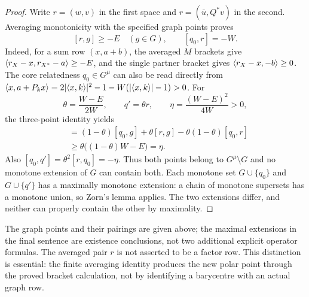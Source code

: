 \begin{proof}
Write $r=(w,v)$ in the first space and
$r=(\bar u,Q^*v)$ in the second. Averaging monotonicity with
the specified graph points proves
\[
[r,g]\ge-E\quad(g\in G),\qquad [q_0,r]=-W.
\]
Indeed, for a sum row $(x,a+b)$, the averaged $M$ brackets
give $\langle r_X-x,r_{X^*}-a\rangle\ge-E$, and the single
partner bracket gives $\langle r_X-x,-b\rangle\ge0$.
The core relatedness $q_0\in G^\mu$ can also be read directly
from $\langle x,a+P_kx\rangle=2|\langle x,k\rangle|^2-1-W(|\langle x,k\rangle|-1)>0$.
For
\[
\theta=\frac{W-E}{2W},\qquad q'=\theta r,
\qquad \eta=\frac{(W-E)^2}{4W}>0,
\]
the three-point identity yields
\begin{align*}
[q',g]
&=(1-\theta)[q_0,g]+\theta[r,g]
                 -\theta(1-\theta)[q_0,r]\\
&\ge\theta\bigl((1-\theta)W-E\bigr)=\eta.
\end{align*}
Also $[q_0,q']=\theta^2[r,q_0]=-\eta$.
Thus both points belong to $G^\mu\setminus G$ and no monotone
extension of $G$ can contain both. Each monotone set
$G\cup\{q_0\}$ and $G\cup\{q'\}$ has a maximally monotone
extension: a chain of monotone supersets has a monotone union,
so Zorn's lemma applies. The two extensions differ, and neither
can properly contain the other by maximality.
\end{proof}
The graph points and their pairings are given above; the maximal
extensions in the final sentence are existence conclusions, not
two additional explicit operator formulas. The averaged pair $r$
is not asserted to be a factor row. This distinction is essential:
the finite averaging identity produces the new polar point through
the proved bracket calculation, not by identifying a barycentre
with an actual graph row.
